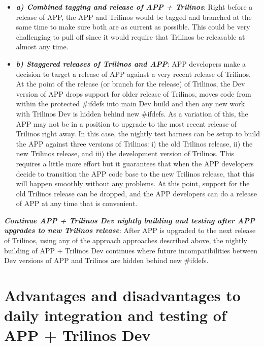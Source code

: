 \documentclass[pdf,ps2pdf,11pt]{SANDreport}
\begin{document}
    \begin{itemize}

    {}\item\textit{\textbf{a) Combined tagging and release of APP +
    Trilinos}}: Right before a release of APP, the APP and Trilinos would be
    tagged and branched at the same time to make sure both are as current as
    possible.  This could be very challenging to pull off since it would
    require that Trilinos be releasable at almost any time.

    {}\item\textit{\textbf{b) Staggered releases of Trilinos and APP}}: APP
    developers make a decision to target a release of APP against a very
    recent release of Trilinos.  At the point of the release (or branch for
    the release) of Trilinos, the Dev version of APP drops support for older
    release of Trilinos, moves code from within the protected {}\#ifdefs into
    main Dev build and then any new work with Trilinos Dev is hidden behind
    new {}\#ifdefs.  As a variation of this, the APP may not be in a position
    to upgrade to the most recent release of Trilinos right away.  In this
    case, the nightly test harness can be setup to build the APP against three
    versions of Trilinos: i) the old Trilinos release, ii) the new Trilinos
    release, and iii) the development version of Trilinos.  This requires a
    little more effort but it guarantees that when the APP developers decide
    to transition the APP code base to the new Trilinos release, that this
    will happen smoothly without any problems.  At this point, support for the
    old Trilinos release can be dropped, and the APP developers can do a
    release of APP at any time that is convenient.

    \end{itemize}

{}\textit{\textbf{Continue APP + Trilinos Dev nightly building and testing
after APP upgrades to new Trilinos release}}: After APP is upgraded to the next
release of Trilinos, using any of the approach approaches described above, the
nightly building of APP + Trilinos Dev continues where future
incompatibilities between Dev versions of APP and Trilinos are hidden behind
new {}\#ifdefs.


%
{}\section{Advantages and disadvantages to daily integration and testing of APP
+ Trilinos Dev}
%
\end{document}
